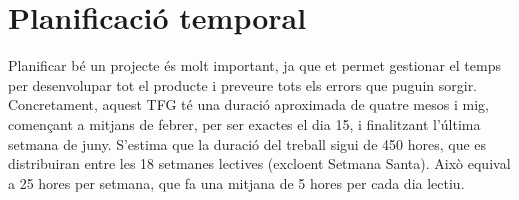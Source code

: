 \documentclass[a4paper]{article}
\begin{document}

\newpage
\section{Planificació temporal}
Planificar bé un projecte és molt important, ja que et permet gestionar el temps per desenvolupar tot el producte i preveure tots els errors que puguin sorgir. Concretament, aquest TFG té una duració aproximada de quatre mesos i mig, començant a mitjans de febrer, per ser exactes el dia 15, i finalitzant l'última setmana de juny. S'estima que la duració del treball sigui de 450 hores, que es distribuiran entre les 18 setmanes lectives (excloent Setmana Santa). Això equival a 25 hores per setmana, que fa una mitjana de 5 hores per cada dia lectiu. 
\end{document}
